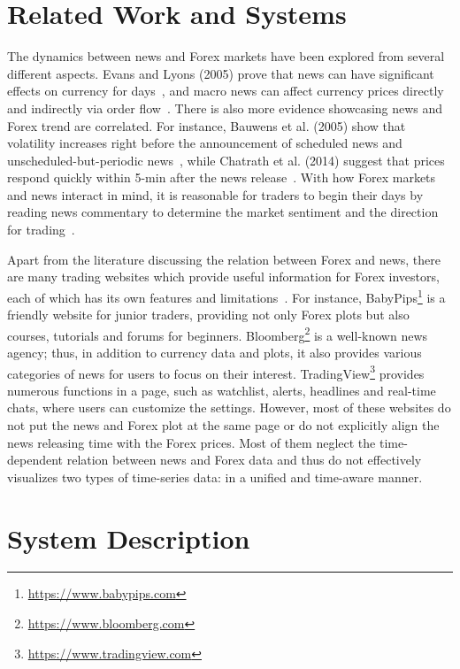 \documentclass[sigconf]{acmart}
\begin{document}
\section{Related Work and Systems}\label{sec:related}
The dynamics between news and Forex markets have been explored from several different aspects.
Evans and Lyons (2005) prove that news can have significant effects on currency for days~\cite{EVANS2005197}, and macro news can affect currency prices directly and indirectly via order flow~\cite{EVANS200826}.
There is also more evidence showcasing news and Forex trend are correlated.
For instance, Bauwens et al.  (2005) show that volatility increases right before the announcement of scheduled news and unscheduled-but-periodic news~\cite{BAUWENS20051108}, while Chatrath et al. (2014) suggest that prices respond quickly within 5-min after the news release~\cite{CHATRATH201442}.
With how Forex markets and news interact in mind, it is reasonable for traders to begin their days by reading news commentary to determine the market sentiment and the direction for trading~\cite{samuels2015trader}.

Apart from the literature discussing the relation between Forex and news, there are many trading websites which provide useful information for Forex investors, each of which has its own features and limitations~\cite{ForexWebsites}.
For instance, BabyPips\footnote{\url{https://www.babypips.com}} is a friendly website for junior traders, providing not only Forex plots but also courses, tutorials and forums for beginners. Bloomberg\footnote{\url{https://www.bloomberg.com}} is a well-known news agency; thus, in addition to currency data and plots, it also provides various categories of news for users to focus on their interest.
TradingView\footnote{\url{https://www.tradingview.com}} provides numerous functions in a page, such as watchlist, alerts, headlines and real-time chats, where users can customize the settings. 
However, most of these websites do not put the news and Forex plot at the same page or do not explicitly align the news releasing time with the Forex prices.
Most of them neglect the time-dependent relation between news and Forex data and thus do not effectively visualizes two types of time-series data: in a unified and time-aware manner. 


\section{System Description}\label{sec:system}
\end{document}
